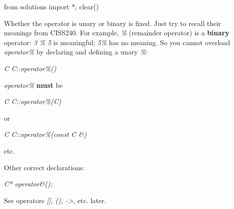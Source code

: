 \begin{python0}
from solutions import *; clear()
\end{python0}

Whether the operator is unary or binary is fixed. Just try to recall
their meanings from CISS240. For example, \textit{\%} (remainder operator)
is a \textbf{binary} operator: \textit{3 \% 5} is meaningful; \textit{5\%}
has no meaning. So you cannot overload \textit{operator\%} by declaring
and defining a unary \textit{\%}:

\textit{C C::operator\%()}

\textit{operator\%} \textbf{must} be

\textit{C C::operator\%(C)}

or

\textit{C C::operator\%(const C \&)}

etc.

Other correct declarations:

\textit{C* operator\&();}

See operators \textit{[], (), ->}, etc. later.


